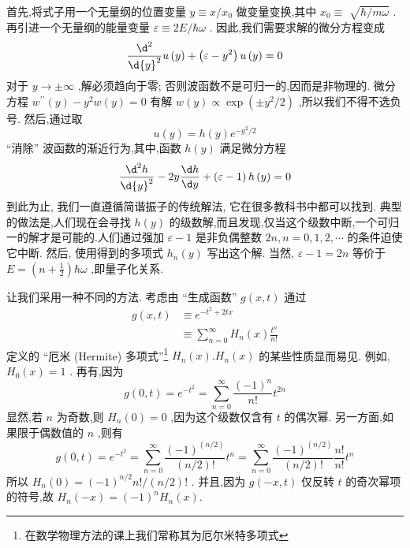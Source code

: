 \documentclass[lang=cn,newtx,10pt,scheme=chinese,thmcnt=section]{elegantbook}
\begin{document}
首先,将式子用一个无量纲的位置变量 $y \equiv x/{x}_{0}$ 做变量变换,其中 ${x}_{0} \equiv$ $\sqrt{\hbar /{m\omega }}$ . 再引进一个无量纲的能量变量 $\varepsilon \equiv {2E}/\hbar \omega$ . 因此,我们需要求解的微分方程变成
\begin{equation}
	\frac{{\d}^{2}}{\d{y}^{2}}u\left( y\right) + \left( {\varepsilon - {y}^{2}}\right) u\left( y\right) = 0
\end{equation}
对于 $y \rightarrow \pm \infty$ ,解必须趋向于零; 否则波函数不是可归一的,因而是非物理的. 微分方程 ${w}^{\prime \prime }\left( y\right) - {y}^{2}w\left( y\right) = 0$ 有解 $w\left( y\right) \propto \exp \left( {\pm {y}^{2}/2}\right)$ ,所以我们不得不选负号. 然后,通过取
\begin{equation}
	u\left( y\right) = h\left( y\right) {e}^{-{y}^{2}/2}
\end{equation}
“消除” 波函数的渐近行为,其中,函数 $h\left( y\right)$ 满足微分方程
\begin{equation}
	\frac{{\d}^{2}h}{\d{y}^{2}} - {2y}\frac{\d h}{\d y} + \left( {\varepsilon - 1}\right) h\left( y\right) = 0
\end{equation}
到此为止, 我们一直遵循简谐振子的传统解法, 它在很多教科书中都可以找到. 典型的做法是,人们现在会寻找 $h\left( y\right)$ 的级数解,而且发现,仅当这个级数中断,一个可归一的解才是可能的.人们通过强加 $\varepsilon - 1$ 是非负偶整数 ${2n}, n = 0,1,2,\cdots$ 的条件迫使它中断. 然后, 使用得到的多项式 ${h}_{n}\left( y\right)$ 写出这个解. 当然, $\varepsilon - 1 = {2n}$ 等价于 $E = \left( {n + \frac{1}{2}}\right) \hbar \omega$ ,即量子化关系.

让我们采用一种不同的方法. 考虑由 “生成函数” $g\left( {x, t}\right)$ 通过
\begin{equation}
	\begin{aligned}
		g\left( {x, t}\right) &\equiv {e}^{-{t}^{2} + {2tx}}\\
		&\equiv \mathop{\sum }\limits_{{n = 0}}^{\infty }{H}_{n}\left( x\right) \frac{{t}^{n}}{n!}
	\end{aligned}
\end{equation}
定义的 “厄米 (Hermite) 多项式”\footnote{在数学物理方法的课上我们常称其为厄尔米特多项式} ${H}_{n}\left( x\right) .{H}_{n}\left( x\right)$ 的某些性质显而易见. 例如, ${H}_{0}\left( x\right)= 1$ . 再有,因为
\begin{equation}
	g\left( {0, t}\right) = {e}^{-{t}^{2}} = \mathop{\sum }\limits_{{n = 0}}^{\infty }\frac{{\left( -1\right) }^{n}}{n!}{t}^{2n}
\end{equation}
显然,若 $n$ 为奇数,则 ${H}_{n}\left( 0\right) = 0$ ,因为这个级数仅含有 $t$ 的偶次幂. 另一方面,如果限于偶数值的 $n$ ,则有
\begin{equation}
	g\left( {0, t}\right) = {e}^{-{t}^{2}} = \mathop{\sum }\limits_{{n = 0}}^{\infty }\frac{{\left( -1\right) }^{\left( n/2\right) }}{\left( {n/2}\right) !}{t}^{n} = \mathop{\sum }\limits_{{n = 0}}^{\infty }\frac{{\left( -1\right) }^{\left( n/2\right) }}{\left( {n/2}\right) !}\frac{n!}{n!}{t}^{n} 
\end{equation}
所以 ${H}_{n}\left( 0\right) = {\left( -1\right) }^{n/2}n!/\left( {n/2}\right) !$ . 并且,因为 $g\left( {-x, t}\right)$ 仅反转 $t$ 的奇次幂项的符号,故 ${H}_{n}\left( {-x}\right) = {\left( -1\right) }^{n}{H}_{n}\left( x\right) .$
\end{document}
